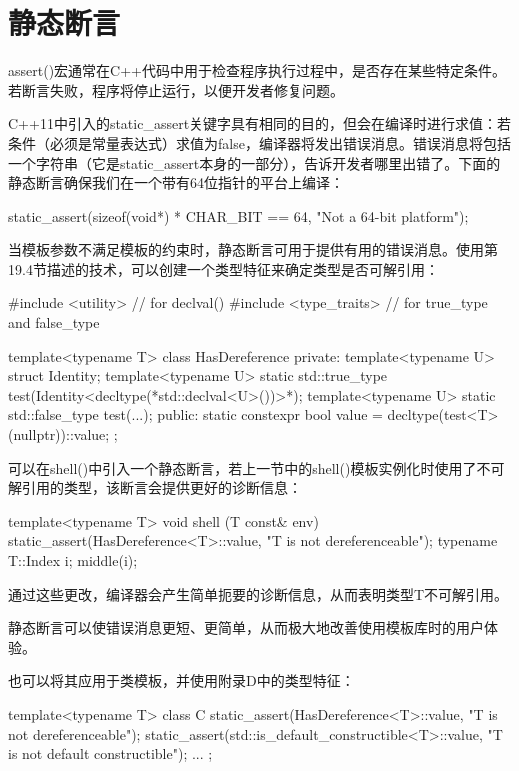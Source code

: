 \section{静态断言}
assert()宏通常在C++代码中用于检查程序执行过程中，是否存在某些特定条件。若断言失败，程序将停止运行，以便开发者修复问题。

C++11中引入的static\_assert关键字具有相同的目的，但会在编译时进行求值：若条件（必须是常量表达式）求值为false，编译器将发出错误消息。错误消息将包括一个字符串（它是static\_assert本身的一部分），告诉开发者哪里出错了。下面的静态断言确保我们在一个带有64位指针的平台上编译：

\begin{cpp}
static_assert(sizeof(void*) * CHAR_BIT == 64, "Not a 64-bit platform");
\end{cpp}

当模板参数不满足模板的约束时，静态断言可用于提供有用的错误消息。使用第19.4节描述的技术，可以创建一个类型特征来确定类型是否可解引用：

\begin{cpp}
#include <utility> // for declval()
#include <type_traits> // for true_type and false_type

template<typename T>
class HasDereference {
	private:
	template<typename U> struct Identity;
	template<typename U> static std::true_type
		test(Identity<decltype(*std::declval<U>())>*);
	template<typename U> static std::false_type
		test(...);
	public:
	static constexpr bool value = decltype(test<T>(nullptr))::value;
};
\end{cpp}

可以在shell()中引入一个静态断言，若上一节中的shell()模板实例化时使用了不可解引用的类型，该断言会提供更好的诊断信息：

\begin{cpp}
template<typename T>
void shell (T const& env)
{
	static_assert(HasDereference<T>::value, "T is not dereferenceable");
	typename T::Index i;
	middle(i);
}
\end{cpp}

通过这些更改，编译器会产生简单扼要的诊断信息，从而表明类型T不可解引用。

静态断言可以使错误消息更短、更简单，从而极大地改善使用模板库时的用户体验。

也可以将其应用于类模板，并使用附录D中的类型特征：

\begin{cpp}
template<typename T>
class C {
	static_assert(HasDereference<T>::value, "T is not dereferenceable");
	static_assert(std::is_default_constructible<T>::value,
				  "T is not default constructible");
	...
};
\end{cpp}




































